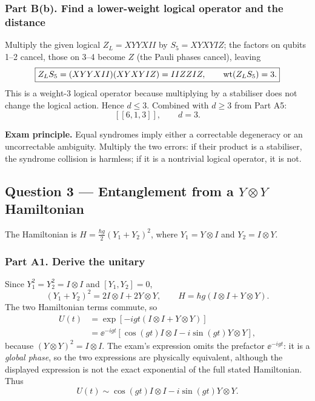 \subsubsection*{Part B(b). Find a lower-weight logical operator and the distance}
Multiply the given logical $Z_L=XYYXII$ by $S_5=XYXYIZ$; the factors on qubits 1--2 cancel, those on 3--4 become $Z$ (the Pauli phases cancel), leaving
\begin{equation}\boxed{Z_L S_5=(XYYXII)(XYXYIZ)=IIZZIZ,\qquad \operatorname{wt}(Z_LS_5)=3.}\end{equation}
This is a weight-3 logical operator because multiplying by a stabiliser does not change the logical action. Hence $d\leq3$. Combined with $d\geq3$ from Part A5:
\begin{equation}\boxed{[[6,1,3]],\qquad d=3.}\end{equation}
\begin{examtip}\textbf{Exam principle.} Equal syndromes imply either a correctable degeneracy or an uncorrectable ambiguity. Multiply the two errors: if their product is a stabiliser, the syndrome collision is harmless; if it is a nontrivial logical operator, it is not.\end{examtip}

\subsection{Question 3 --- Entanglement from a $Y\otimes Y$ Hamiltonian}
The Hamiltonian is $H=\frac{\hbar g}{2}(Y_1+Y_2)^2$, where $Y_1=Y\otimes I$ and $Y_2=I\otimes Y$.
\subsubsection*{Part A1. Derive the unitary}
Since $Y_1^2=Y_2^2=I\otimes I$ and $[Y_1,Y_2]=0$,
\begin{equation}(Y_1+Y_2)^2=2I\otimes I+2Y\otimes Y,\qquad H=\hbar g(I\otimes I+Y\otimes Y).\end{equation}
The two Hamiltonian terms commute, so
\begin{align}
U(t)&=\exp[-igt(I\otimes I+Y\otimes Y)]\\
&=\ee^{-igt}\left[\cos(gt)I\otimes I-i\sin(gt)Y\otimes Y\right],
\end{align}
because $(Y\otimes Y)^2=I\otimes I$. The exam's expression omits the prefactor $\ee^{-igt}$: it is a \emph{global phase}, so the two expressions are physically equivalent, although the displayed expression is not the exact exponential of the full stated Hamiltonian. Thus
\begin{equation}\boxed{U(t)\sim\cos(gt)I\otimes I-i\sin(gt)Y\otimes Y.}\end{equation}

